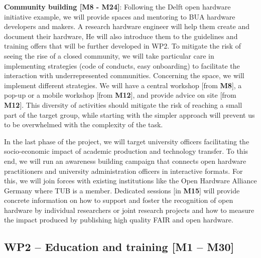\documentclass[
  12pt,
  a4paper,
]{article}
\begin{document}
\textbf{Community building {[}M8 - M24{]}}: Following the Delft open
hardware initiative example, we will provide spaces and mentoring to BUA
hardware developers and makers. A research hardware engineer will help
them create and document their hardware, He will also introduce them to
the guidelines and training offers that will be further developed in
WP2. To mitigate the risk of seeing the rise of a closed community, we
will take particular care in implementing strategies (code of conducts,
easy onboarding) to facilitate the interaction with underrepresented
communities. Concerning the space, we will implement different
strategies. We will have a central workshop {[}from \textbf{M8}{]}, a
pop-up or a mobile workshop {[}from \textbf{M12}{]}, and provide advice
on site {[}from \textbf{M12}{]}. This diversity of activities should
mitigate the risk of reaching a small part of the target group, while
starting with the simpler approach will prevent us to be overwhelmed
with the complexity of the task.

In the last phase of the project, we will target university officers
facilitating the socio-economic impact of academic production and
technology transfer. To this end, we will run an awareness building
campaign that connects open hardware practitioners and university
administration officers in interactive formats. For this, we will join
forces with existing institutions like the Open Hardware Alliance
Germany where TUB is a member. Dedicated sessions {[}in \textbf{M15}{]}
will provide concrete information on how to support and foster the
recognition of open hardware by individual researchers or joint research
projects and how to measure the impact produced by publishing high
quality FAIR and open hardware.

\hypertarget{wp2-education-and-training-m1-m30}{%
\subsection{WP2 -- Education and training {[}M1 --
M30{]}}\label{wp2-education-and-training-m1-m30}}
\end{document}
